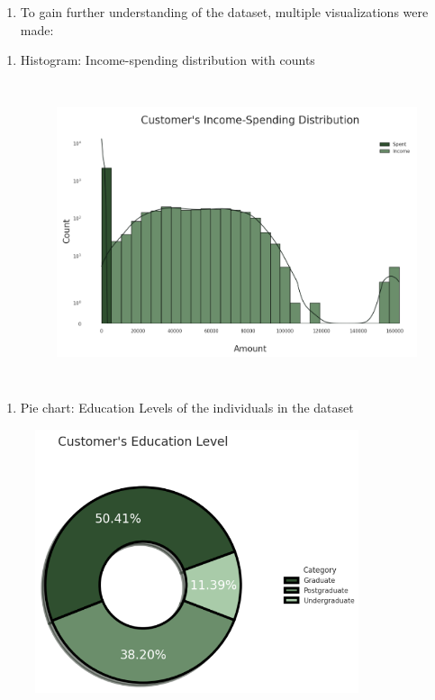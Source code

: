 \documentclass[11pt]{article}
\begin{document}
\vspace{1\baselineskip}
\begin{enumerate}
	\item To gain further understanding of the dataset, multiple visualizations were made:

\end{enumerate}
\vspace{1\baselineskip}
\begin{enumerate}
	\item Histogram: Income-spending distribution with counts

\begin{figure}[H]
\centering
\includegraphics[width=12.7cm,height=8.83cm]{./images/image19.png}
\end{figure}


\end{enumerate}
\vspace{1\baselineskip}
\begin{enumerate}
	\item Pie chart: Education Levels of the individuals in the dataset

\end{enumerate}
\vspace{1\baselineskip}
\begin{figure}[H]
\centering
\includegraphics[width=9.52cm,height=7.73cm]{./images/image6.png}
\end{figure}
\end{document}
